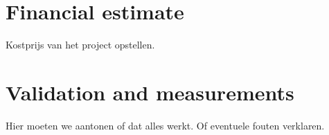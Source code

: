 \documentclass[11pt,a4paper]{article}
\begin{document}
\section{Financial estimate}
Kostprijs van het project opstellen.

\section{Validation and measurements}
Hier moeten we aantonen of dat alles werkt. Of eventuele fouten verklaren.

\newpage
	

\newpage
\appendix
\end{document}
